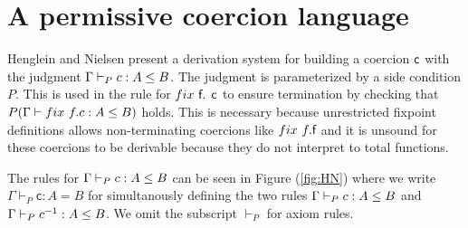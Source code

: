 \documentclass[a4paper,UKenglish,cleveref, autoref, thm-restate]{lipics-v2021}
\begin{document}
\section{A permissive coercion language}
Henglein and Nielsen present a derivation system for building a coercion $\textsf{c}$ with the judgment $\containsG{c}{A}{B}$. The judgment is parameterized by a side condition $P$. 
This is used in the rule for $\fix~\dslcom{f. c}$ to ensure termination by checking that $P(\contains{\Gamma}{\fix~ \mathsf{f.c}}{A}{B})$ holds. This is necessary because unrestricted fixpoint definitions allows non-terminating coercions like $\fix~ \mathsf{f}.\dslcom{f}$ and it is unsound for these coercions to be derivable because they do not interpret to total functions. 

The rules for $\containsG{c}{A}{B}$ can be seen in Figure (\ref{fig:HN}) where we write $\Gamma \vdash_P \mathsf{c}: {A} = {B}$ for simultanously defining the two rules  $\containsG{c}{A}{B}$ and  $\containsG{c^{-1}}{A}{B}$. We omit the subscript $\vdash_P$ for axiom rules. 
\end{document}
